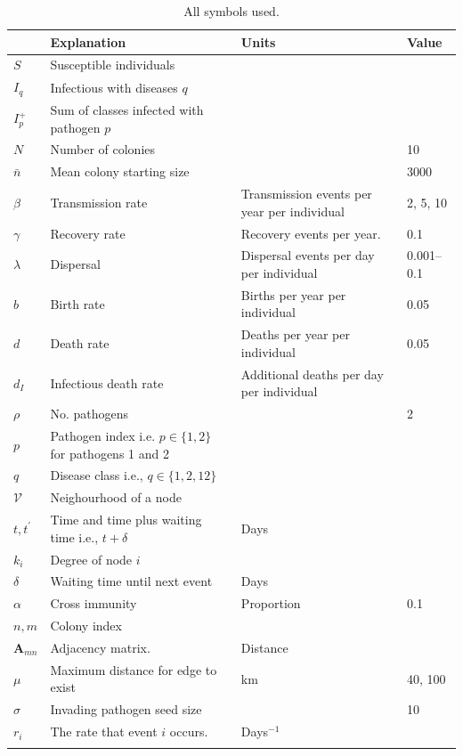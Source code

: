 \begin{table}[b!]

\begin{tabular}{lp{5.6cm}p{4.3cm}l}
 & Explanation & Units&Value\\
\hline
$S$ & Susceptible individuals &&\\
$I_q$ & Infectious with diseases $q$ &&\\
$I^+_p$ & Sum of classes infected with pathogen $p$ &\\
$N$ & Number of colonies&& 10\\
$\bar{n}$ & Mean colony starting size && 3000\\
$\beta$ & Transmission rate & Transmission events per year per individual& 2, 5, 10\\
$\gamma$ & Recovery rate & Recovery events per year. & 0.1\\
$\lambda$ & Dispersal & Dispersal events per day per individual& 0.001--0.1\\
$b$ & Birth rate & Births per year per individual& 0.05\\
$d$ & Death rate & Deaths per year per individual & 0.05\\
$d_I$ & Infectious death rate & Additional deaths per day per individual&\\
$\rho$ & No. pathogens && 2\\
$p$ &  Pathogen index i.e. $p\in\{1,2\}$ for pathogens 1 and 2 & &\\
$q$ & Disease class i.e., $q\in\{1,2,12\}$&\\
$\mathcal{V}$ & Neighourhood of a node &&\\
$t, t^\prime$ & Time and time plus waiting time i.e., $t+\delta$ & Days&\\
$k_i$ & Degree of node $i$ &&\\
$\delta$ & Waiting time until next event & Days&\\
$\alpha$ & Cross immunity & Proportion& 0.1\\
$n, m$ & Colony index &&\\
$\bm{A}_{mn}$ & Adjacency matrix. & Distance &\\
$\mu$ & Maximum distance for edge to exist & km& 40, 100\\
$\sigma$ & Invading pathogen seed size & & 10\\
$r_i$ & The rate that event $i$ occurs. & Days$^{-1}$&\\
&&&\\
\end{tabular}
\caption{All symbols used.}
\label{t:params}
\end{table}




